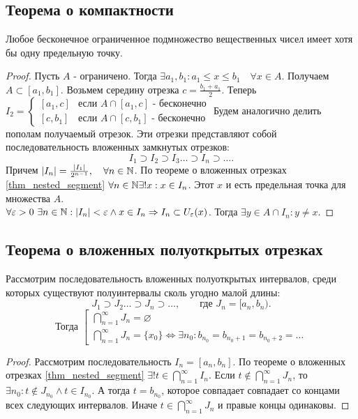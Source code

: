 \documentclass[12pt]{report}
\begin{document}
\subsection{Теорема о компактности}\label{ques_11}
\begin{thm}[о компактности]
    Любое бесконечное ограниченное подмножество вещественных чисел имеет хотя бы одну предельную точку.
\end{thm}
\begin{proof}
    Пусть $A$ - ограничено. Тогда $\exists a_1, b_1: a_1 \le x \le b_1 \quad \forall x \in A$. Получаем $A \subset [a_1, b_1]$. Возьмем середину отрезка $c = \frac{b_1+a_1}{2}$. Теперь $I_2 = \left \{ 
    \begin{array}{ll}
	{[a_1, c]} & \mbox{если } A \cap [a_1, c] \mbox{ - бесконечно}\\
	{[c, b_1]} & \mbox{если } A \cap [c, b_1] \mbox{ - бесконечно}
\end{array}
\right .$
Будем аналогично делить пополам получаемый отрезок. Эти отрезки представляют собой последовательность вложенных замкнутых отрезков: \[
I_1 \supset I_2 \supset I_3 \ldots \supset I_n \supset \ldots 
.\] 
Причем $|I_n| = \frac{|I_1|}{2^{n-1}} , \quad \forall n \in \mathbb{N}$. По теореме о вложенных отрезках \ref{thm_nested_segment} $\forall n \in \mathbb{N} \exists ! x: x \in I_n $. Этот $x$ и есть предельная точка для множества $A $.\\
$\forall \varepsilon  > 0 ~\exists n \in \mathbb{N}: |I_n| < \varepsilon \wedge x \in I_n \Rightarrow I_n \subset U_{\varepsilon } (x)$. Тогда $\exists y \in A \cap I_n: y\ne x$. 
\end{proof}
\subsection{Теорема о вложенных полуоткрытых отрезках}\label{ques_12}
\begin{thm}\label{thm_nested_segment_2}
    Рассмотрим последовательность вложенных полуоткрытых интервалов, среди которых существуют полуинтервалы сколь угодно малой длины:
    \[
	J_1 \supset J_2 \ldots \supset J_n \supset\ldots  ,  \qquad \mbox{где } J_n = [a_n, b_n)
    .\] 
    \[
    \mbox{Тогда } \left [ 
    \begin{array}{l}
	\bigcap \limits_{n=1}^{\infty} J_n = \varnothing\\
	\bigcap \limits_{n=1}^{\infty} J_n = \{x_0\} \Longleftrightarrow \exists n_0 : b_{n_0} = b_{n_0 + 1} = b_{n_0 +2} =\ldots 
    \end{array}
    \right .
    \] 
\end{thm}
\begin{proof}
    Рассмотрим последовательность $I_n = [a_n, b_n]$.
    По теореме о вложенных отрезках \ref{thm_nested_segment} $\exists ! t \in  \bigcap \limits_{n=1}^{\infty} I_n$. Если $t \notin \bigcap \limits_{n=1}^{\infty} J_n$, то $\exists n_0: t \notin J_{n_0} \wedge t \in I_{n_0}$.
    А тогда $t = b_{n_0}$, которое совпадает совпадает со концами всех следующих интервалов. Иначе $t \in \bigcap \limits_{n=1}^{\infty} J_n$ и правые концы одинаковы.
\end{proof}
\end{document}

